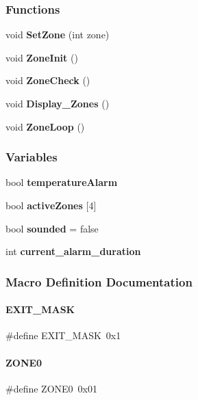 \subsubsection*{Functions}
\begin{DoxyCompactItemize}
\item 
void \textbf{ Set\+Zone} (int zone)
\item 
void \textbf{ Zone\+Init} ()
\item 
void \textbf{ Zone\+Check} ()
\item 
void \textbf{ Display\+\_\+\+Zones} ()
\item 
void \textbf{ Zone\+Loop} ()
\end{DoxyCompactItemize}
\subsubsection*{Variables}
\begin{DoxyCompactItemize}
\item 
bool \textbf{ temperature\+Alarm}
\item 
bool \textbf{ active\+Zones} [4]
\item 
bool \textbf{ sounded} = false
\item 
int \textbf{ current\+\_\+alarm\+\_\+duration}
\end{DoxyCompactItemize}


\subsubsection{Macro Definition Documentation}
\mbox{\label{a00059_aba22d804907583c6c89f8f1e4cfbaa2d}} 
\paragraph{E\+X\+I\+T\+\_\+\+M\+A\+SK}
{\footnotesize\ttfamily \#define E\+X\+I\+T\+\_\+\+M\+A\+SK~0x1}

\mbox{\label{a00059_a06c04947834ee242f5e178b30c8f0643}} 
\paragraph{Z\+O\+N\+E0}
{\footnotesize\ttfamily \#define Z\+O\+N\+E0~0x01}

\mbox{\label{a00059_afefcabfb130a243e06dbea99ffbfe4f5}} 
